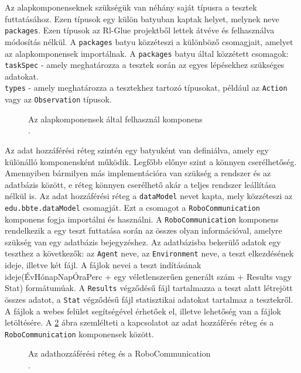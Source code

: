 Az alapkomponenseknek szükségük van néhány saját típusra a tesztek futtatásához. Ezen típusok egy külön batyuban kaptak helyet, melynek neve \texttt{packages}. Ezen típusok az Rl-Glue projektből lettek átvéve és felhasználva módosítás nélkül. A \texttt{packages} batyu közzéteszi a különböző csomagjait, amelyet az alapkomponensek importálnak. A \texttt{packages} batyu által közzétett csomagok:
\\
\texttt{taskSpec} - amely meghatározza a tesztek során az egyes lépésekhez szükséges adatokat.
\\
\texttt{types} - amely meghatározza a tesztekhez tartozó típusokat, például az \texttt{Action} vagy az \texttt{Observation} típusok.

\begin{figure}[h!]
  \centering
  \caption[Az alapkomponensek által felhasznál komponens]%
  {Az alapkomponensek által felhasznál komponens\\
  {\white .}\hfill\url{}}
  \label{fig:PackagesKomponens}
\end{figure}


Az adat hozzáférési réteg szintén egy batyuként van definiálva, amely egy különálló komponensként működik. Legfőbb előnye szint a könnyen cserélhetőség. Amennyiben bármilyen más implementációra van szükség a rendszer és az adatbázis között, e réteg könnyen cserélhető akár a teljes rendszer leállítása nélkül is. Az adat hozzáférési réteg a \texttt{dataModel} nevet kapta, mely közzéteszi az \texttt{edu.bbte.dataModel} csomagját. Ezt a csomagot a \texttt{RoboCommunication} komponens fogja importálni és használni. A \texttt{RoboCommunication} komponens rendelkezik a egy teszt futtatása során az összes olyan információval, amelyre szükség van egy adatbázis bejegyzéshez. Az adatbázisba bekerülő adatok egy teszthez a következők: az \texttt{Agent} neve, az \texttt{Environment} neve, a teszt elkezdésének ideje, illetve két fájl. A fájlok nevei a teszt indításának ideje(ÉvHónapNapÓraPerc + egy véletlenszerűen generált szám + Results vagy Stat) formátumúak. A \texttt{Results} végződésű fájl tartalmazza a teszt alatt létrejött összes adatot, a \texttt{Stat} végződésű fájl statisztikai adatokat tartalmaz a tesztekről. A fájlok a webes felület segítségével érhetőek el, illetve lehetőség van a fájlok letöltésére. A \ref{fig:dataModelRobo} ábra szemlélteti a kapcsolatot az adat hozzáférés réteg és a \texttt{RoboCommunication} komponensek között. 

\begin{figure}[h!]
  \centering
  \caption[Az adathozzáférési réteg és a RoboCommunication]%
  {Az adathozzáférési réteg és a RoboCommunication\\
  {\white .}\hfill\url{}}
  \label{fig:dataModelRobo}
\end{figure}

